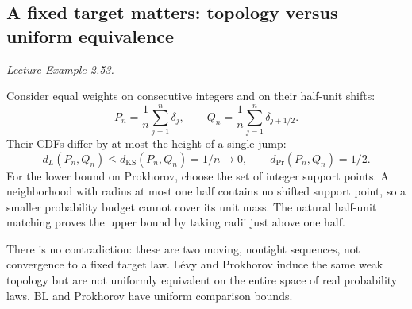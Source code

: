 \documentclass[12pt]{article}
\begin{document}
\subsection{A fixed target matters: topology versus uniform equivalence}
\textit{Lecture Example 2.53.}

Consider equal weights on consecutive integers and on their half-unit shifts:
\begin{equation}
 P_n=\frac1n\sum_{j=1}^n\delta_j,
 \qquad Q_n=\frac1n\sum_{j=1}^n\delta_{j+1/2}.
\end{equation}
Their CDFs differ by at most the height of a single jump:
\begin{equation}
 d_L(P_n,Q_n)\le d_{\mathrm{KS}}(P_n,Q_n)=1/n\to0,
 \qquad d_{\mathrm{Pr}}(P_n,Q_n)=1/2.
\end{equation}
For the lower bound on Prokhorov, choose the set of integer support points.
A neighborhood with radius at most one half contains no shifted support
point, so a smaller probability budget cannot cover its unit mass.
The natural half-unit matching proves the upper bound by taking radii
just above one half.

There is no contradiction: these are two moving, nontight sequences, not
convergence to a fixed target law. L\'evy and Prokhorov induce the same weak
topology but are not uniformly equivalent on the entire space of real
probability laws. BL and Prokhorov have uniform comparison bounds.


\par\endgroup
\end{document}
